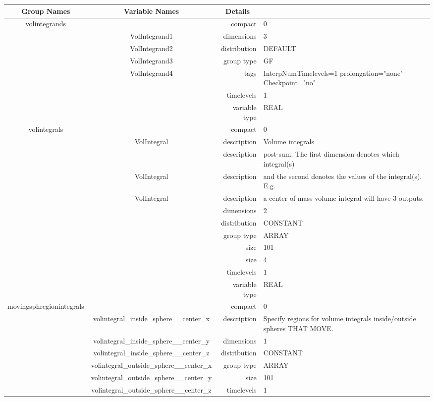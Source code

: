 \begin{tabular*}{150mm}{|c|c@{\extracolsep{\fill}}|rl|} \hline 
~ {\bf Group Names} ~ & ~ {\bf Variable Names} ~  &{\bf Details} ~ & ~\\ 
\hline 
volintegrands &  & compact & 0 \\ 
 & VolIntegrand1 & dimensions & 3 \\ 
 & VolIntegrand2 & distribution & DEFAULT \\ 
 & VolIntegrand3 & group type & GF \\ 
 & VolIntegrand4 & tags & InterpNumTimelevels=1 prolongation="none" Checkpoint="no" \\ 
 &  & timelevels & 1 \\ 
 &  & variable type & REAL \\ 
\hline 
volintegrals &  & compact & 0 \\ 
 & VolIntegral & description & Volume integrals \\ 
& ~ & description &  post-sum. The first dimension denotes which integral(s) \\ 
 & VolIntegral & description &  and the second denotes the values of the integral(s). E.g. \\ 
 & VolIntegral & description &  a center of mass volume integral will have 3 outputs. \\ 
 &  & dimensions & 2 \\ 
 &  & distribution & CONSTANT \\ 
 &  & group type & ARRAY \\ 
 &  & size & 101 \\ 
& ~ & size & 4 \\ 
 &  & timelevels & 1 \\ 
 &  & variable type & REAL \\ 
\hline 
movingsphregionintegrals &  & compact & 0 \\ 
 & volintegral\_inside\_sphere\_\_center\_x & description & Specify regions for volume integrals inside/outside spheres THAT MOVE. \\ 
 & volintegral\_inside\_sphere\_\_center\_y & dimensions & 1 \\ 
 & volintegral\_inside\_sphere\_\_center\_z & distribution & CONSTANT \\ 
 & volintegral\_outside\_sphere\_\_center\_x & group type & ARRAY \\ 
 & volintegral\_outside\_sphere\_\_center\_y & size & 101 \\ 
 & volintegral\_outside\_sphere\_\_center\_z & timelevels & 1 \\ 

\end{tabular*}
